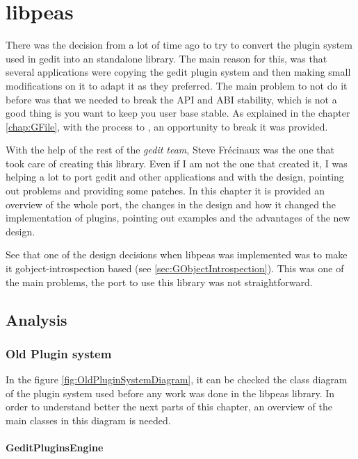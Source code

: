 
\chapter{libpeas}

There was the decision from a lot of time ago to try to convert the plugin system used in gedit into an standalone library. The main reason for this, was that several applications were copying the gedit plugin system and then making small modifications on it to adapt it as they preferred. The main problem to not do it before was that we needed to break the API and ABI stability, which is not a good thing is you want to keep you user base stable. As explained in the chapter \ref{chap:GFile}, with the process to , an opportunity to break it was provided.

With the help of the rest of the \emph{gedit team}, Steve Fr\'ecinaux was the one that took care of creating this library. Even if I am not the one that created it, I was helping a lot to port gedit and other applications and with the design, pointing out problems and providing some patches. In this chapter it is provided an overview of the whole port, the changes in the design and how it changed the implementation of plugins, pointing out examples and the advantages of the new design.

See that one of the design decisions when libpeas was implemented was to make it gobject-introspection based (see \ref{sec:GObjectIntrospection}). This was one of the main problems, the port to use this library was not straightforward.

\section{Analysis}

\subsection{Old Plugin system}


In the figure \ref{fig:OldPluginSystemDiagram}, it can be checked the class diagram of the plugin system used before any work was done in the libpeas library. In order to understand better the next parts of this chapter, an overview of the main classes in this diagram is needed.

\subsubsection{GeditPluginsEngine}

